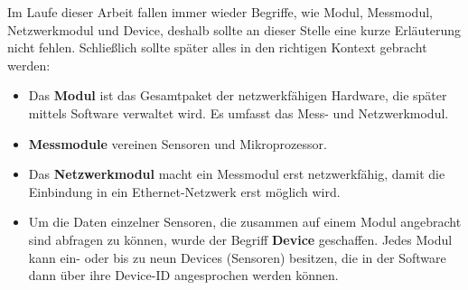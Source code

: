 \documentclass[a4paper,14pt,headsepline]{scrartcl}
\begin{document}
\newpage

\begin{figure}[h]
\begin{center}
\end{center}
\end{figure}

Im Laufe dieser Arbeit fallen immer wieder Begriffe, wie Modul, Messmodul, Netzwerkmodul und Device, deshalb sollte an dieser Stelle eine kurze Erläuterung nicht fehlen. Schließlich sollte später alles in den richtigen Kontext gebracht werden:

\begin{itemize}

\item Das \textbf{Modul} ist das Gesamtpaket der netzwerkfähigen Hardware, die später mittels Software verwaltet wird. Es umfasst das Mess- und Netzwerkmodul.
\item \textbf{Messmodule} vereinen Sensoren und Mikroprozessor. 
\item Das \textbf{Netzwerkmodul} macht ein Messmodul erst netzwerkfähig, damit die Einbindung in ein Ethernet-Netzwerk erst möglich wird.
\item Um die Daten einzelner Sensoren, die zusammen auf einem Modul angebracht sind abfragen zu können, wurde der Begriff \textbf{Device} geschaffen. Jedes Modul kann ein- oder bis zu neun Devices (Sensoren) besitzen, die in der Software dann über ihre Device-ID angesprochen werden können.

\end{itemize}

\newpage
\end{document}

